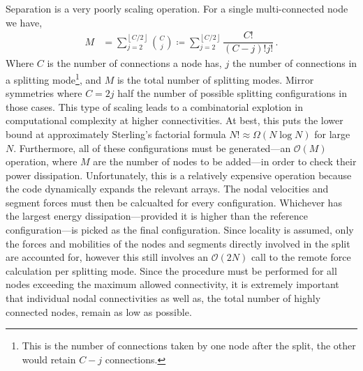 Separation is a very poorly scaling operation. For a single multi-connected node we have,
\begin{align}
    M & = \sum\limits_{j=2}^{\left\lfloor C/2 \right\rfloor} \binom{C}{j} \coloneqq \sum\limits_{j=2}^{\left\lfloor C/2 \right\rfloor} \dfrac{C!}{(C-j)! j!}\,.
\end{align}
Where $C$ is the number of connections a node has, $j$ the number of connections in a splitting mode\footnote{This is the number of connections taken by one node after the split, the other would retain $C-j$ connections.}, and $M$ is the total number of splitting modes. Mirror symmetries where $C = 2j$ half the number of possible splitting configurations in those cases. This type of scaling leads to a combinatorial explotion in computational complexity at higher connectivities. At best, this puts the lower bound at approximately Sterling's factorial formula $N! \approx \Omega(N\log{N})$ for large $N$. Furthermore, all of these configurations must be generated---an $\mathcal{O}(M)$ operation, where $M$ are the number of nodes to be added---in order to check their power dissipation. Unfortunately, this is a relatively expensive operation because the code dynamically expands the relevant arrays. The nodal velocities and segment forces must then be calcualted for every configuration. Whichever has the largest energy dissipation---provided it is higher than the reference configuration---is picked as the final configuration. Since locality is assumed, only the forces and mobilities of the nodes and segments directly involved in the split are accounted for, however this still involves an $\mathcal{O}(2 N)$ call to the remote force calculation per splitting mode. Since the procedure must be performed for all nodes exceeding the maximum allowed connectivity, it is extremely important that individual nodal connectivities as well as, the total number of highly connected nodes, remain as low as possible.

